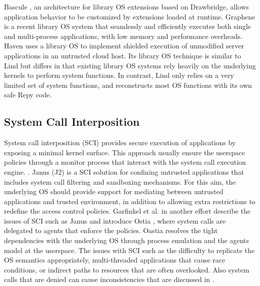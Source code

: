 Bascule \cite{Bascule}, an architecture for library OS extensions
based on Drawbridge, allows application behavior to be customized by
extensions loaded at runtime.
Graphene \cite{Graphene-14} is a recent library OS system that
seamlessly and efficiently executes both single and
multi-process applications, with low memory and performance overheads.
Haven \cite{Haven} uses a library OS to implement
shielded execution of unmodified server applications
in an untrusted cloud host. 
Its library OS technique is similar to Lind but differs in 
that existing library OS systems rely heavily on
the underlying kernels to perform system functions. In contrast, Lind only
relies on a very limited set of system functions,
and reconstructs most OS functions with its own safe Repy code. 

\subsection{System Call Interposition}

System call interposition (SCI) provides 
secure execution of applications by exposing a minimal kernel surface. This approach usually ensure the userspace policies through a monitor process that interact with the system call execution engine.   
\cite{SCI-04}.  
Janus (J2) \cite{Janus0:96, Janus:99} is a SCI solution for confining untrusted applications that includes system call filtering and sandboxing mechanisms. For this aim, the underlying OS should provide support for mediating between untrusted applications and trusted environment, in addition to allowing extra restrictions to redefine the access control policies. Garfinkel et al. in another effort describe the issues of SCI such as Janus and introduce Ostia \cite{SCI-04}, where system calls are delegated to agents that enforce the policies. Oastia resolves the tight dependencies with the underlying OS through process emulation and the agents model at the userspace.
%
The issues with SCI such as the difficulty to replicate the OS semantics appropriately, multi-threaded applications that cause race conditions, or indirect paths to resources that are often overlooked. Also system calls that are denied can cause inconsistencies that are discussed in \cite{Problems-SCI}.

